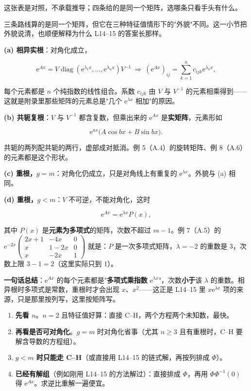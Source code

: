 \documentclass[11pt]{ctexart}
\newcommand{\mat}[1]{\begin{pmatrix}#1\end{pmatrix}}
\newcommand{\diag}{\operatorname{diag}}
\begin{document}
这张表是对照，不承载推导；四条给的是同一个矩阵，选哪条只看手头有什么。


三条路线算的是同一个矩阵，但它在三种特征值情形下的"外貌"不同。这一小节把外貌说清，也顺便解释为什么 L14--15 的答案长那样。

\textbf{(a) 相异实根}：对角化成立，

\[
\mathrm{e}^{Ax}=V\diag(\mathrm{e}^{\lambda_1x},\dots,\mathrm{e}^{\lambda_nx})V^{-1}
\ \Longrightarrow\
(\mathrm{e}^{Ax})_{ij}=\sum_{k=1}^{n}c_{ijk}\mathrm{e}^{\lambda_kx},
\]

每个元素都是 $n$ 个纯指数的线性组合。系数 $c_{ijk}$ 由 $V$ 与 $V^{-1}$ 的元素相乘得到——这就是附录里那些矩阵的元素总是"几个 $\mathrm{e}^{\lambda x}$ 相加"的原因。

\textbf{(b) 共轭复根}：$V$ 与 $V^{-1}$ 都含复数，但乘出来的 $\mathrm{e}^{Ax}$ 是\textbf{实矩阵}，元素形如

\[
\mathrm{e}^{ax}\bigl(A\cos bx+B\sin bx\bigr).
\]

共轭的两列配共轭的两行，虚部成对抵消。例 5（A.4）的旋转矩阵、例 8（A.6）的元素都是这个形状。

\textbf{(c) 重根，$g=m$}：对角化仍成立，只是对角线上有重复的 $\mathrm{e}^{\lambda x}$。外貌与 (a) 相同。

\textbf{(d) 重根，$g<m$}：$V$ 不可逆，不能对角化，这时

\[
\mathrm{e}^{Ax}=\mathrm{e}^{\lambda x}P(x),
\]

其中 $P(x)$ 是\textbf{元素为多项式}的矩阵，次数不超过 $m-1$。例 7（A.5）的 $\mathrm{e}^{-2x}\mat{2x+1&-4x&0\\x&1-2x&0\\x&-2x&1}$ 就是：$P$ 是一次多项式矩阵，$\lambda=-2$ 的重数是 $3$，次数上限 $3-1=2$（这里实际只到 $1$）。

\textbf{一句话总结}：$\mathrm{e}^{Ax}$ 的每个元素都是"\textbf{多项式乘指数} $\mathrm{e}^{\lambda x}$"，次数\textbf{小于}该 $\lambda$ 的重数。相异根时多项式是常数，重根时才会出现 $x$、$x^2$——这正是 L14--15 里 $x\mathrm{e}^{\lambda x}$ 项的来源，只是那里按列写，这里按矩阵写。

\hdr{§6}{拿到 $A$ 时怎么选}

\begin{enumerate}
  \item \textbf{先看 $n$}。$n=2$ 且特征值好算：直接 C--H，两个方程两个未知数，最快。
  \item \textbf{再看是否可对角化}。$g=m$ 时对角化省事（尤其 $n\ge3$ 且有重根时，C--H 要解含导数的方程组）。
  \item \textbf{$g<m$ 时只能走 C--H}（或直接用 L14--15 的链式解，再按列排成 $\Phi$）。
  \item \textbf{已经有解组}（例如刚用 L14--15 的方法解过）：直接排成 $\Phi$，再用 $\Phi\Phi^{-1}(0)$ 得 $\mathrm{e}^{Ax}$。求逆比重解一遍便宜。
\end{enumerate}
\end{document}

